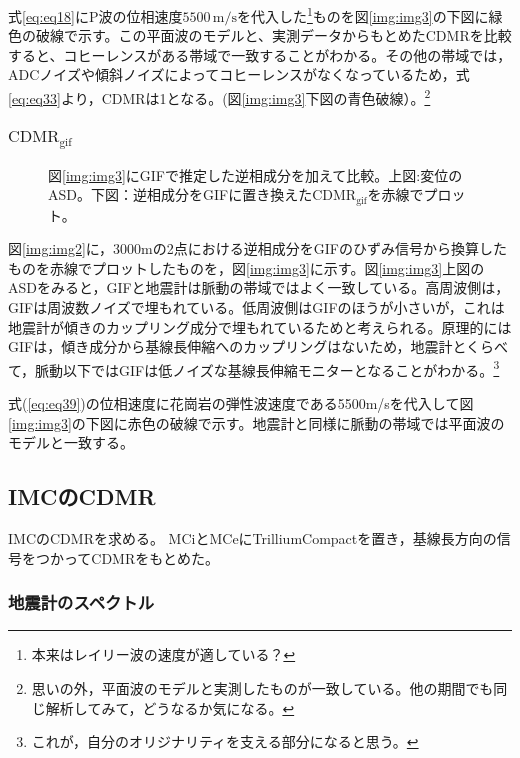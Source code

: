 式\ref{eq:eq18}にP波の位相速度$5500\, \mathrm{m/s}$を代入した\footnote[9]{本来はレイリー波の速度が適している？}ものを図\ref{img:img3}の下図に緑色の破線で示す。この平面波のモデルと、実測データからもとめたCDMRを比較すると、コヒーレンスがある帯域で一致することがわかる。その他の帯域では，ADCノイズや傾斜ノイズによってコヒーレンスがなくなっているため，式\ref{eq:eq33}より，CDMRは1となる。(図\ref{img:img3}下図の青色破線）。\footnote[10]{思いの外，平面波のモデルと実測したものが一致している。他の期間でも同じ解析してみて，どうなるか気になる。}

\subsubsection{$\mathrm{CDMR_{gif}}$}
\begin{figure}[H]
  \begin{center}
  \end{center}
  \caption{図\ref{img:img3}にGIFで推定した逆相成分を加えて比較。上図:変位のASD。下図：逆相成分をGIFに置き換えた$\mathrm{CDMR_{gif}}$を赤線でプロット。
  }\label{img:img4}
\end{figure}


図\ref{img:img2}に，3000mの2点における逆相成分をGIFのひずみ信号から換算したものを赤線でプロットしたものを，図\ref{img:img3}に示す。図\ref{img:img3}上図のASDをみると，GIFと地震計は脈動の帯域ではよく一致している。高周波側は，GIFは周波数ノイズで埋もれている。低周波側はGIFのほうが小さいが，これは地震計が傾きのカップリング成分で埋もれているためと考えられる。原理的にはGIFは，傾き成分から基線長伸縮へのカップリングはないため，地震計とくらべて，脈動以下ではGIFは低ノイズな基線長伸縮モニターとなることがわかる。\footnote[11]{これが，自分のオリジナリティを支える部分になると思う。}

式(\ref{eq:eq39})の位相速度に花崗岩の弾性波速度である5500m/sを代入して図\ref{img:img3}の下図に赤色の破線で示す。地震計と同様に脈動の帯域では平面波のモデルと一致する。


\subsection{IMCのCDMR}
IMCのCDMRを求める。%
MCiとMCeにTrilliumCompactを置き，基線長方向の信号をつかってCDMRをもとめた。


\subsubsection{地震計のスペクトル}

